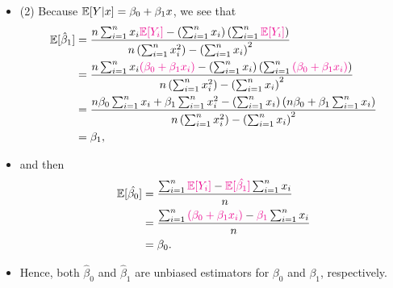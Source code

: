 \begin{frame}[fragile]
	\begin{itemize}
		\item[] (2) Because $\mathbb{E}[Y|x]=\beta_0+\beta_1x$, we see that
		\begin{align*}
					\mathbb{E}[\hat\beta_1] & = \frac{n\sum_{i=1}^n x_i\textcolor{magenta}{\mathbb{E}[Y_i]} - \left(\sum_{i=1}^n x_i\right)\left(\sum_{i=1}^n \textcolor{magenta}{\mathbb{E}[Y_i]}\right)}{n\left(\sum_{i=1}^n x_i^2\right)-\left(\sum_{i=1}^n x_i\right)^2}\\
					&=  \frac{n\sum_{i=1}^n x_i\textcolor{magenta}{(\beta_0+\beta_1x_i)} - \left(\sum_{i=1}^n x_i\right)\left(\sum_{i=1}^n \textcolor{magenta}{(\beta_0+\beta_1x_i)}\right)}{n\left(\sum_{i=1}^n x_i^2\right)-\left(\sum_{i=1}^n x_i\right)^2}\\
					&=  \frac{n\beta_0\sum_{i=1}^n x_i+\beta_1\sum_{i=1}^nx_i^2 - \left(\sum_{i=1}^n x_i\right)\left( n\beta_0+\beta_1\sum_{i=1}^nx_i\right)}{n\left(\sum_{i=1}^n x_i^2\right)-\left(\sum_{i=1}^n x_i\right)^2}\\
					&= \beta_1,
		\end{align*}
		\item[] and then
		\begin{align*}
			\mathbb{E}[\hat{\beta_0}]& =  \frac{\sum_{i=1}^n\textcolor{magenta}{\mathbb{E}[Y_i]}-\textcolor{magenta}{\mathbb{E}[\hat{\beta_1}]}\sum_{i=1}^nx_i}{n}\\
			                 & =  \frac{\sum_{i=1}^n\textcolor{magenta}{(\beta_0+\beta_1x_i)}-\textcolor{magenta}{\beta_1}\sum_{i=1}^nx_i}{n}\\
											 & = \beta_0.
		\end{align*}
		\item[] Hence, both $\hat{\beta}_0$ and $\hat{\beta}_1$ are unbiased estimators for $\beta_0$ and $\beta_1$, respectively.
	\end{itemize}
\end{frame}
